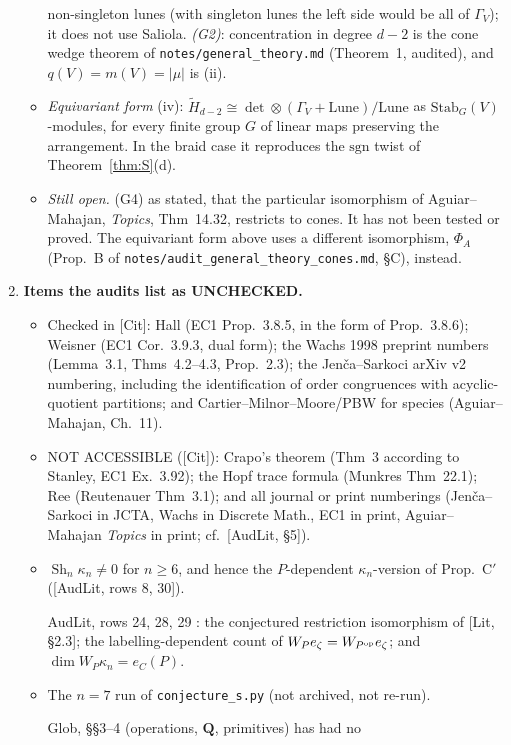 \documentclass[11pt]{article}
\theoremstyle{definition}
\theoremstyle{remark}
\newcommand{\Sh}{\operatorname{Sh}}
\newcommand{\src}[1]{\nolinkurl{#1}}
\begin{document}
\begin{enumerate}
\begin{itemize}[nosep]
    non-singleton lunes (with singleton lunes the left side would be all
    of $\Gamma_V$); it does not use Saliola. \emph{(G2)}: concentration in degree $d-2$
    is the cone wedge theorem of \src{notes/general_theory.md} (Theorem~1,
    audited), and $q(V)=m(V)=|\mu|$ is (ii).
  \item \emph{Equivariant form} (iv):
    $\tilde H_{d-2}\cong\det\otimes(\Gamma_V+\mathrm{Lune})/\mathrm{Lune}$
    as $\mathrm{Stab}_G(V)$-modules, for every finite group $G$ of linear
    maps preserving the arrangement. In the braid case it reproduces the
    $\mathrm{sgn}$ twist of Theorem~\ref{thm:S}(d).
  \item \emph{Still open.} (G4) as stated, that the particular
    isomorphism of Aguiar--Mahajan, \emph{Topics}, Thm~14.32, restricts to
    cones. It has not been tested or proved. The equivariant form above
    uses a different isomorphism, $\Phi_A$ (Prop.~B of
    \src{notes/audit_general_theory_cones.md}, \S C), instead.
  \end{itemize}
\item \textbf{Items the audits list as UNCHECKED.}
  \begin{itemize}[nosep]
  \item Checked in [Cit]: Hall (EC1 Prop.~3.8.5, in the form of
    Prop.~3.8.6); Weisner (EC1 Cor.~3.9.3, dual form); the Wachs 1998
    preprint numbers (Lemma~3.1, Thms~4.2--4.3, Prop.~2.3); the
    Jen\v{c}a--Sarkoci arXiv v2 numbering, including the identification of
    order congruences with acyclic-quotient partitions; and
    Cartier--Milnor--Moore/PBW for species (Aguiar--Mahajan, Ch.~11).
  \item NOT ACCESSIBLE ([Cit]): Crapo's theorem (Thm~3 according to
    Stanley, EC1 Ex.~3.92); the Hopf trace formula (Munkres Thm~22.1); Ree
    (Reutenauer Thm~3.1); and all journal or print numberings
    (Jen\v{c}a--Sarkoci in JCTA, Wachs in Discrete Math., EC1 in print,
    Aguiar--Mahajan \emph{Topics} in print; cf.\ [AudLit, \S5]).
  \item $\Sh_n\kappa_n\ne0$ for $n\ge6$, and hence the $P$-dependent
    $\kappa_n$-version of Prop.~C$'$ ([AudLit, rows 8, 30]).
  \item [AudLit, rows 24, 28, 29]: the conjectured restriction isomorphism
    of [Lit, \S2.3]; the labelling-dependent count of $W_Pe_\zeta=W_{P^{\rm op}}e_\zeta$;
    and $\dim W_P\kappa_n=e_C(P)$.
  \item The $n=7$ run of \src{conjecture_s.py} (not archived, not re-run).
  \item [Glob, \S\S3--4] (operations, $\mathbf Q$, primitives) has had no

\end{itemize}
\end{enumerate}
\end{document}
